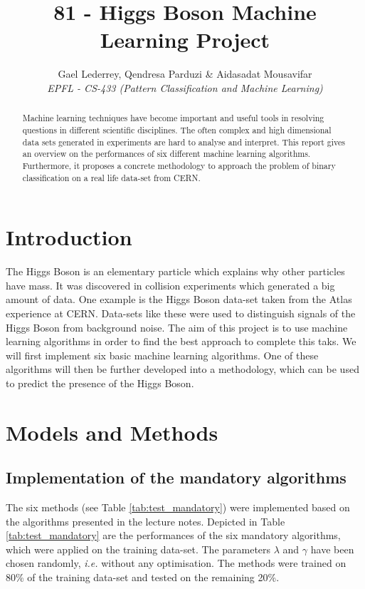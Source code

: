 \documentclass[10pt,conference,compsocconf]{IEEEtran}
\begin{document}
\title{81 - Higgs Boson Machine Learning Project}

\author{
  Gael Lederrey, Qendresa Parduzi \& Aidasadat Mousavifar \\
  \textit{EPFL - CS-433 (\emph{Pattern Classification and Machine Learning})}
}

\maketitle

\begin{abstract}

Machine learning techniques have become important and useful tools in resolving questions in different scientific disciplines. The often complex and high dimensional data sets generated in experiments are hard to analyse and interpret. This report gives an overview on the performances of six different machine learning algorithms. Furthermore, it proposes a concrete methodology to approach the problem of binary classification on a real life data-set from CERN.
\end{abstract}

\section{Introduction}
\label{sec:introduction}

The Higgs Boson is an elementary particle which explains why other particles have mass. It was discovered in collision experiments which generated a big amount of data. One example is the Higgs Boson data-set taken from the Atlas experience at CERN. Data-sets like these were used to distinguish signals of the Higgs Boson from background noise. The aim of this project is to use machine learning algorithms in order to find the best approach to complete this taks. We will first implement six basic machine learning algorithms. One of these algorithms will then be further developed into a methodology, which can be used to predict the presence of the Higgs Boson.

\section{Models and Methods}
\label{sec:models_and_methods}

\subsection{Implementation of the mandatory algorithms}
\label{subsec:test}
The six methods (see Table \ref{tab:test_mandatory}) were implemented based on the algorithms presented in the lecture notes.
Depicted in Table \ref{tab:test_mandatory} are the performances of the six mandatory algorithms, which were applied on the training data-set. The parameters $\lambda$ and $\gamma$ have been chosen randomly, \emph{i.e.} without any optimisation. The methods were trained on 80\% of the training data-set and tested on the remaining 20\%.
\end{document}
